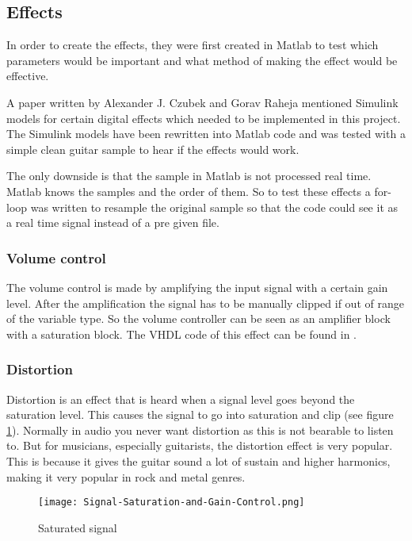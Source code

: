 \subsection{Effects}
In order to create the effects, they were first created in Matlab to test which parameters would be important and what method of making the effect would be effective. 

A paper \cite{Guitar_Effects_Processor_Using_DSP} written by Alexander J. Czubek and Gorav Raheja mentioned Simulink models for certain digital effects which needed to be implemented in this project. The Simulink models have been rewritten into Matlab code and was tested with a simple clean guitar sample to hear if the effects would work. 

The only downside is that the sample in Matlab is not processed real time. Matlab knows the samples and the order of them. So to test these effects a for-loop was written to resample the original sample so that the code could see it as a real time signal instead of a pre given file.

\subsubsection{Volume control}
The volume control is made by amplifying the input signal with a certain gain level. After the amplification the signal has to be manually clipped if out of range of the variable type. So the volume controller can be seen as an amplifier block with a saturation block. The VHDL code of this effect can be found in \nameref{}.

\subsubsection{Distortion}
Distortion is an effect that is heard when a signal level goes beyond the saturation level. This causes the signal to go into saturation and clip (see figure \ref{fig:saturated_signal}). Normally in audio you never want distortion as this is not bearable to listen to. But for musicians, especially guitarists, the distortion effect is very popular. This is because it gives the guitar sound a lot of sustain and higher harmonics, making it very popular in rock and metal genres. 

\begin{figure}[ht]
    \centering
    \texttt{[image: Signal-Saturation-and-Gain-Control.png]}
    \caption{Saturated signal}
    \label{fig:saturated_signal}
\end{figure}

